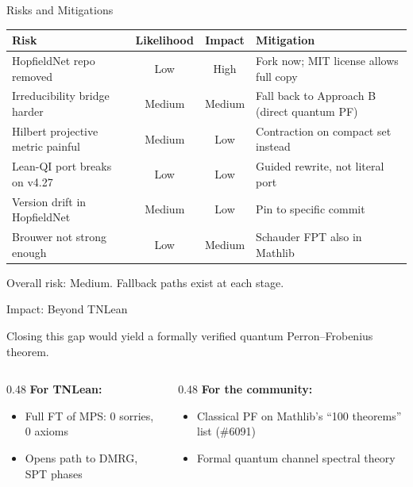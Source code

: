 \documentclass[aspectratio=169,10pt]{beamer}
\begin{document}
\begin{frame}{Risks and Mitigations}

\renewcommand{\arraystretch}{1.15}
\begin{tabular}{>{\footnotesize}p{3.4cm} >{\footnotesize}c >{\footnotesize}c >{\footnotesize}p{4.2cm}}
\textbf{Risk} & \textbf{Likelihood} & \textbf{Impact} & \textbf{Mitigation} \\
\midrule
HopfieldNet repo removed & Low & High & Fork now; MIT license allows full copy \\
Irreducibility bridge harder & \textcolor{amber}{Medium} & \textcolor{amber}{Medium} & Fall back to Approach B (direct quantum PF) \\
Hilbert projective metric painful & \textcolor{amber}{Medium} & Low & Contraction on compact set instead \\
Lean-QI port breaks on v4.27 & Low & Low & Guided rewrite, not literal port \\
Version drift in HopfieldNet & \textcolor{amber}{Medium} & Low & Pin to specific commit \\
Brouwer not strong enough & Low & \textcolor{amber}{Medium} & Schauder FPT also in Mathlib \\
\end{tabular}

\vspace{0.4em}
Overall risk: \textcolor{amber}{Medium}. Fallback paths exist at each stage.
\end{frame}

\begin{frame}{Impact: Beyond TNLean}

Closing this gap would yield a formally verified quantum Perron--Frobenius theorem.

\vspace{0.3em}
\begin{columns}[T]
\begin{column}{0.48\textwidth}
\textbf{For TNLean:}
\begin{itemize}\small\itemsep0pt
  \item Full FT of MPS: 0 sorries, 0 axioms
  \item Opens path to DMRG, SPT phases
\end{itemize}
\end{column}
\begin{column}{0.48\textwidth}
\textbf{For the community:}
\begin{itemize}\small\itemsep0pt
  \item Classical PF on Mathlib's ``100 theorems'' list (\#6091)
  \item Formal quantum channel spectral theory
\end{itemize}
\end{column}
\end{columns}
\end{frame}
\end{document}
